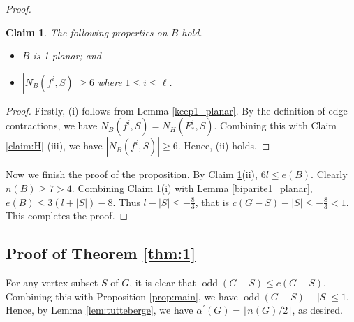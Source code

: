 \documentclass[12pt,a4paper]{article}
\newtheorem{claim}{Claim}[section]
\DeclareMathOperator{\odd}{odd}
\begin{document}
\begin{proof}
\begin{claim}\label{claim:B}
The following properties on $B$ hold.

\begin{itemize}
\item[(i)]  $B$ is 1-planar; and
\item[(ii)] $\left|N_B(f^i,S)\right| \geq 6$ where $1\le i\le \ell$.
\end{itemize}
\end{claim}

\begin{proof}
Firstly, (i) follows from  Lemma \ref{keep1_planar}. By the definition of edge contractions, we have $N_B\left(f^i, S\right)=N_H\left(F_*^i, S\right)$. Combining this with Claim \ref{claim:H} (iii), we have $\left|N_B\left(f^i, S\right)\right| \geq 6$. Hence, (ii) holds.
\end{proof}

Now we ﬁnish the proof of the proposition.
By Claim \ref{claim:B}(ii), $6l\le e(B)$. Clearly $n(B)\ge 7>4$. Combining Claim \ref{claim:B}(i) with Lemma \ref{biparite1_planar}, $e(B) \le 3(l+|S|)-8$. Thus $l-|S|\le -\frac{8}{3}$, that is $c(G-S)-|S|\le -\frac{8}{3}<1$.
 This completes the proof.
\end{proof}








\subsection{Proof of Theorem \ref{thm:1}} 

For any vertex subset $S$ of $G$, it is clear that $\odd(G-S) \leq c(G-S)$. Combining this with Proposition \ref{prop:main}, we have $\odd(G-S)-|S| \leq1$. Hence, by Lemma \ref{lem:tutteberge}, we  have $\alpha^{\prime}(G)=\lfloor n(G) / 2\rfloor$, as desired.


%
%







%
\end{document}
